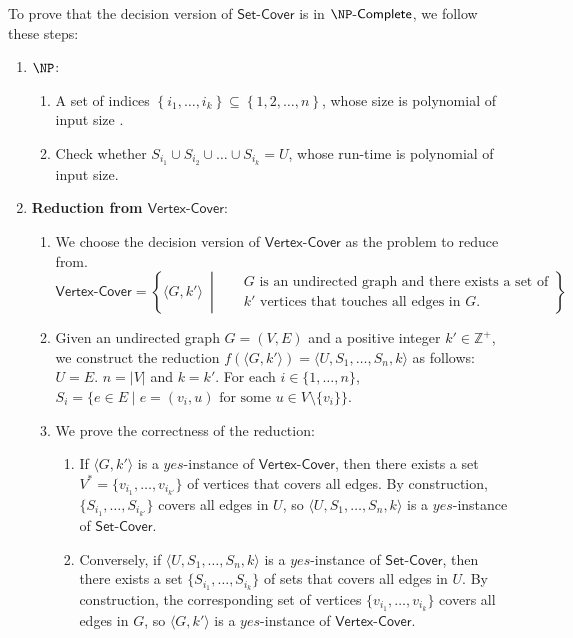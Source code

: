 To prove that the decision version of $\mathsf{Set\text{-}Cover}$ is in $\complete{\NP}$, we follow these steps:
 
\begin{enumerate}
    \item \textbf{$\NP$}:
        \begin{enumerate}
        \item A set of indices $\left\{i_1, \dots, i_k\right\} \subseteq \left\{1, 2, \dots, n\right\}$, whose size is polynomial of input size .
        \item Check whether $S_{i_1} \cup S_{i_2} \cup \dots \cup S_{i_k} = U$, whose run-time is polynomial of input size.
        \end{enumerate}
    \item \textbf{Reduction from $\mathsf{Vertex\text{-}Cover}$}:
        \begin{enumerate}
            \item We choose the decision version of $\mathsf{Vertex\text{-}Cover}$ as the problem to reduce from.
            \begin{equation*}
            \mathsf{Vertex\text{-}Cover} = \left\{\langle{G,k'\rangle}~\middle|~~~
            \begin{aligned}
                &\text{$G$ is an undirected graph and there exists a set of} \\&\text{$k'$ vertices that touches all edges in $G$.}
            \end{aligned}\right\}
            \end{equation*}
            \item Given an undirected graph $G = (V, E)$ and a positive integer $k' \in \mathbb{Z}^+$, we construct the reduction $f(\langle G, k' \rangle) = \langle U, S_1, \ldots, S_n, k \rangle$ as follows: $U = E$. $n = |V|$ and $k = k'$. For each $i \in \{1, \ldots, n\}$, $S_i = \{e \in E \mid e = (v_i, u) \text{ for some } u \in V \setminus \{v_i\}\}$.
            \item We prove the correctness of the reduction:
                \begin{enumerate}
                    \item[``$\Rightarrow$'':] If $\langle G, k' \rangle$ is a $yes$-instance of $\mathsf{Vertex\text{-}Cover}$, then there exists a set $V^* = \{v_{i_1}, \ldots, v_{i_{k'}}\}$ of vertices that covers all edges. By construction, $\{S_{i_1}, \ldots, S_{i_{k'}}\}$ covers all edges in $U$, so $\langle U, S_1, \ldots, S_n, k \rangle$ is a $yes$-instance of $\mathsf{Set\text{-}Cover}$.
                    \item[``$\Leftarrow$'':] Conversely, if $\langle U, S_1, \ldots, S_n, k \rangle$ is a $yes$-instance of $\mathsf{Set\text{-}Cover}$, then there exists a set $\{S_{i_1}, \ldots, S_{i_k}\}$ of sets that covers all edges in $U$. By construction, the corresponding set of vertices $\{v_{i_1}, \ldots, v_{i_k}\}$ covers all edges in $G$, so $\langle G, k' \rangle$ is a $yes$-instance of $\mathsf{Vertex\text{-}Cover}$.
                \end{enumerate}
        \end{enumerate}
\end{enumerate}
 
